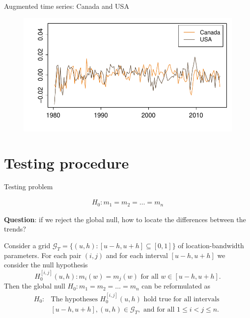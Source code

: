 \documentclass[10pt]{beamer}
\begin{document}
\begin{frame}{Augmented time series: Canada and USA}
	\begin{figure}
    		\centering
    		\includegraphics[height=0.65\textheight]{plots/gdp_CAN_USA_adj.pdf}
  	\end{figure}	
\end{frame}


\section{Testing procedure}

\begin{frame}{Testing problem}

\begin{align*}
H_0: m_1 = m_2 = \ldots = m_n
\end{align*}\pause

\vspace{-4mm}
\textbf{Question}: if we reject the global null, how to locate the differences between the trends? \pause

Consider a grid $\mathcal{G}_T = \{(u, h): [u-h, u+h] \subseteq [0, 1]\}$ of location-bandwidth parameters. \pause For each pair $(i, j)$ and for each interval $[u-h, u+h]$ we consider the null hypothesis 
\[ H_0^{[i,j]}(u,h): m_i(w) = m_j(w) \text{ for all } w \in [u-h,u+h]. \]\pause
Then the global null $H_0: m_1 = m_2 = \ldots = m_n$ can be reformulated as
\begin{align*}
H_0:  &\text{The hypotheses } H_0^{[i,j]}(u,h) \text{ hold true for all intervals } \\ &[u- h , u+h], (u, h) \in \mathcal{G}_T, \text{ and for all } 1 \le i < j \le n. 
\end{align*} 
\end{frame}
\end{document}
